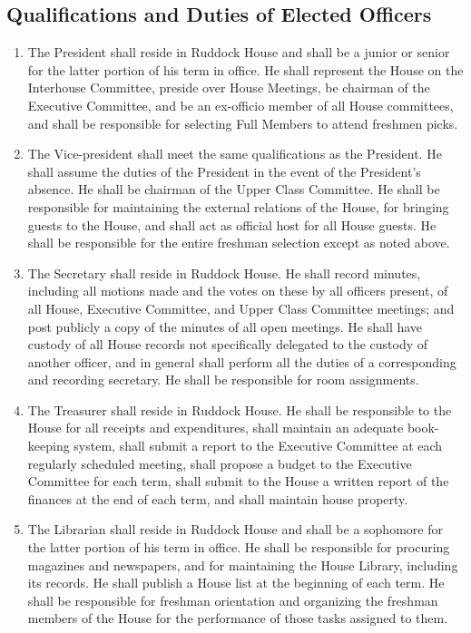 \documentclass[10pt]{article} %
\begin{document}
\subsection{Qualifications and Duties of Elected Officers}
\begin{enumerate}
\item The President shall reside in Ruddock House and shall be a junior or senior for the latter portion of his term in office. He shall represent the House on the Interhouse Committee, preside over House Meetings, be chairman of the Executive Committee, and be an ex-officio member of all House committees, and shall be responsible for selecting Full Members to attend freshmen picks.
\item The Vice-president shall meet the same qualifications as the President. He shall assume the duties of the President in the event of the President’s absence. He shall be chairman of the Upper Class Committee. He shall be responsible for maintaining the external relations of the House, for bringing guests to the House, and shall act as official host for all House guests. He shall be responsible for the entire freshman selection except as noted above.
\item The Secretary shall reside in Ruddock House. He shall record minutes, including all motions made and the votes on these by all officers present, of all House, Executive Committee, and Upper Class Committee meetings; and post publicly a copy of the minutes of all open meetings. He shall have custody of all House records not specifically delegated to the custody of another officer, and in general shall perform all the duties of a corresponding and recording secretary. He shall be responsible for room assignments.
\item The Treasurer shall reside in Ruddock House. He shall be responsible to the House for all receipts and expenditures, shall maintain an adequate book-keeping system, shall submit a report to the Executive Committee at each regularly scheduled meeting, shall propose a budget to the Executive Committee for each term, shall submit to the House a written report of the finances at the end of each term, and shall maintain house property.
\item The Librarian shall reside in Ruddock House and shall be a sophomore for the latter portion of his term in office. He shall be responsible for procuring magazines and newspapers, and for maintaining the House Library, including its records. He shall publish a House list at the beginning of each term. He shall be responsible for freshman orientation and organizing the freshman members of the House for the performance of those tasks assigned to them.

\end{enumerate}
\end{document}
